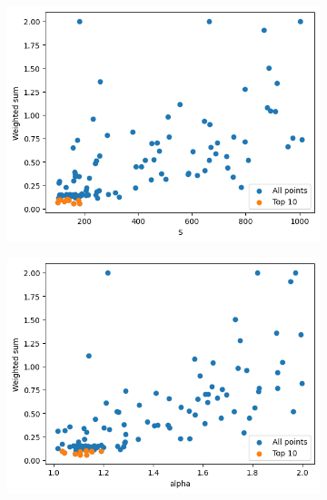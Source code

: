 \begin{frame}
\begin{figure}

        \hfill
        \begin{subfigure}{0.45\textwidth}
            \includegraphics[width=\textwidth]{../images/report/w112-S.png}
        \end{subfigure}
        \hfill
        \begin{subfigure}{0.45\textwidth}
            \includegraphics[width=\textwidth]{../images/report/w112-alpha.png}
        \end{subfigure}
        \hfill
    \end{figure}
\end{frame}

